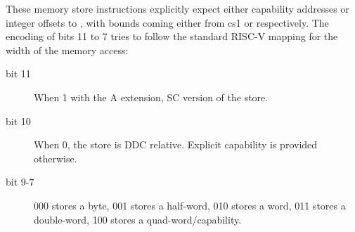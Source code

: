 {




\vspace{1em}


These memory store instructions explicitly expect either capability addresses
or integer offsets to \DDC{}, with bounds coming either from cs1 or \DDC{}
respectively. The encoding of bits 11 to 7 tries to follow the standard RISC-V
mapping for the width of the memory access:
\begin{description}
\item [bit 11] When 1 with the A extension, SC version of the store.
\item [bit 10] When 0, the store is DDC relative. Explicit capability is provided otherwise.
\item [bit 9-7] 000 stores a byte, 001 stores a half-word, 010 stores a word, 011 stores a double-word, 100 stores a quad-word/capability.
\end{description}

\vspace{1em}

\rvcheriheader
{}

















}
